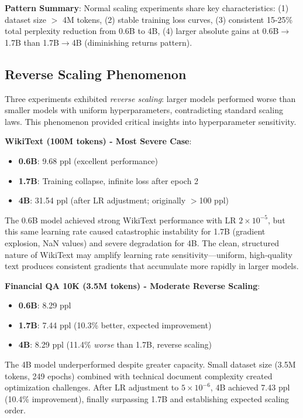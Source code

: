 \textbf{Pattern Summary}: Normal scaling experiments share key characteristics: (1) dataset size $>$ 4M tokens, (2) stable training loss curves, (3) consistent 15-25\% total perplexity reduction from 0.6B to 4B, (4) larger absolute gains at 0.6B$\to$1.7B than 1.7B$\to$4B (diminishing returns pattern).

\subsection{Reverse Scaling Phenomenon}

Three experiments exhibited \textit{reverse scaling}: larger models performed worse than smaller models with uniform hyperparameters, contradicting standard scaling laws. This phenomenon provided critical insights into hyperparameter sensitivity.

\textbf{WikiText (100M tokens) - Most Severe Case}:
\begin{itemize}
\item \textbf{0.6B}: 9.68 ppl (excellent performance)
\item \textbf{1.7B}: Training collapse, infinite loss after epoch 2
\item \textbf{4B}: 31.54 ppl (after LR adjustment; originally $>$100 ppl)
\end{itemize}

The 0.6B model achieved strong WikiText performance with LR $2 \times 10^{-5}$, but this same learning rate caused catastrophic instability for 1.7B (gradient explosion, NaN values) and severe degradation for 4B. The clean, structured nature of WikiText may amplify learning rate sensitivity---uniform, high-quality text produces consistent gradients that accumulate more rapidly in larger models.

\textbf{Financial QA 10K (3.5M tokens) - Moderate Reverse Scaling}:
\begin{itemize}
\item \textbf{0.6B}: 8.29 ppl
\item \textbf{1.7B}: 7.44 ppl (10.3\% better, expected improvement)
\item \textbf{4B}: 8.29 ppl (11.4\% \textit{worse} than 1.7B, reverse scaling)
\end{itemize}

The 4B model underperformed despite greater capacity. Small dataset size (3.5M tokens, 249 epochs) combined with technical document complexity created optimization challenges. After LR adjustment to $5 \times 10^{-6}$, 4B achieved 7.43 ppl (10.4\% improvement), finally surpassing 1.7B and establishing expected scaling order.

